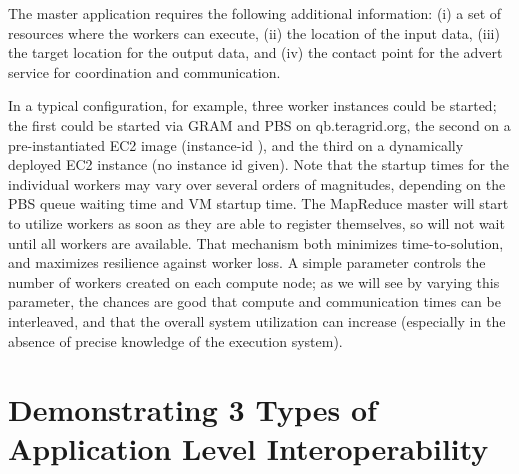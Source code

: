 \documentclass[3p,twocolumn]{elsarticle}
\begin{document}
The master application requires the following additional information:
(i) a set of resources where the workers can execute, (ii) the
location of the input data, (iii) the target location for the output
data, and (iv) the contact point for the advert service for
coordination and communication.  

In a typical configuration, for example, three worker instances could
be started; the first could be started via GRAM and PBS on
qb.teragrid.org, the second on a pre-instantiated EC2 image
(instance-id ), and the third on a dynamically deployed
EC2 instance (no instance id given).  Note that the startup times for
the individual workers may vary over several orders of magnitudes,
depending on the PBS queue waiting time and VM startup time.  The
MapReduce master will start to utilize workers as soon as they are
able to register themselves, so will not wait until all workers are
available.  That mechanism both minimizes time-to-solution, and
maximizes resilience against worker loss.
%
%
A simple parameter controls the number of workers created on each
compute node; as we will see by varying this parameter, the chances
are good that compute and communication times can be interleaved, and
that the overall system utilization can increase (especially in the
absence of precise knowledge of the execution system).
 

\section{Demonstrating 3 Types of Application Level Interoperability}
\label{sec:interop}
\end{document}
